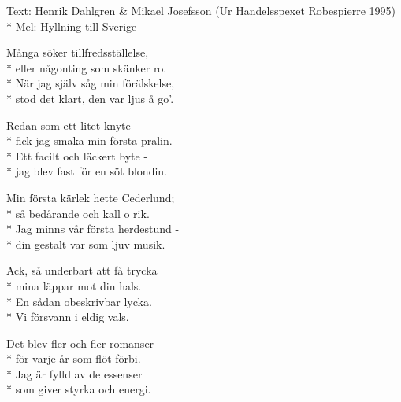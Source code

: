 \begin{SongText}
    \begin{SongInfo}
        Text: Henrik Dahlgren \& Mikael Josefsson (Ur Handelsspexet Robespierre 1995)\\*%
        Mel: Hyllning till Sverige
    \end{SongInfo}
    \begin{SongVerse}
        Många söker tillfredsställelse,\\*%
        eller någonting som skänker ro.\\*%
        När jag själv såg min förälskelse,\\*%
        stod det klart, den var ljus å go’.
    \end{SongVerse}
    \begin{SongVerse}
        Redan som ett litet knyte\\*%
        fick jag smaka min första pralin.\\*%
        Ett facilt och läckert byte -\\*%
        jag blev fast för en söt blondin.
    \end{SongVerse}
    \begin{SongVerse}
        Min första kärlek hette Cederlund;\\*%
        så bedårande och kall o rik.\\*%
        Jag minns vår första herdestund -\\*%
        din gestalt var som ljuv musik.
    \end{SongVerse}
    \begin{SongVerse}
        Ack, så underbart att få trycka\\*%
        mina läppar mot din hals.\\*%
        En sådan obeskrivbar lycka.\\*%
        Vi försvann i eldig vals.
    \end{SongVerse}
    \begin{SongVerse}
        Det blev fler och fler romanser\\*%
        för varje år som flöt förbi.\\*%
        Jag är fylld av de essenser\\*%
        som giver styrka och energi.
    \end{SongVerse}
\end{SongText}